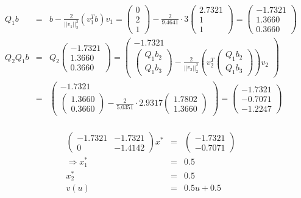\documentclass[11pt]{article} %
\begin{document}
\begin{enumerate}[a)]
\begin{eqnarray*}
Q_1b &=& b - \frac 2 {||v_1||_2^2}(v_1^T b)v_1 = \begin{pmatrix} 0 \\ 2 \\ 1 \end{pmatrix} - \frac 2 {9.4641}\cdot 3\begin{pmatrix}2.7321 \\ 1 \\ 1 \end{pmatrix} = \begin{pmatrix}-1.7321 \\ 1.3660 \\ 0.3660 \end{pmatrix} \\
Q_2Q_1b &=& Q_2\begin{pmatrix}-1.7321 \\ 1.3660 \\ 0.3660 \end{pmatrix} = \begin{pmatrix} -1.7321 \\\hline
\begin{pmatrix} Q_1b_2 \\ Q_1b_3 \end{pmatrix} - \frac 2 {||v_2||_2^2}\left(v_2^T \begin{pmatrix} Q_1b_2 \\ Q_1b_3 \end{pmatrix}\right)v_2  \end{pmatrix} \\
&=& \begin{pmatrix} -1.7321 \\\hline
\begin{pmatrix}1.3660 \\ 0.3660 \end{pmatrix} - \frac 2 {5.0351}\cdot 2.9317 \begin{pmatrix}  1.7802 \\ 1.3660 \end{pmatrix}  \end{pmatrix}
=  \begin{pmatrix}  -1.7321 \\  -0.7071 \\ -1.2247 \end{pmatrix} \\
\end{eqnarray*}

\begin{eqnarray*}
\begin{pmatrix} -1.7321 & -1.7321 \\  0 & -1.4142 \end{pmatrix} x^* &=& \begin{pmatrix} -1.7321 \\ -0.7071 \end{pmatrix} \\
\Rightarrow x_1^* &=& 0.5 \\  x_2^* &=& 0.5 \\
v(u) &=& 0.5u + 0.5
\end{eqnarray*}


\end{enumerate}
\end{document}
